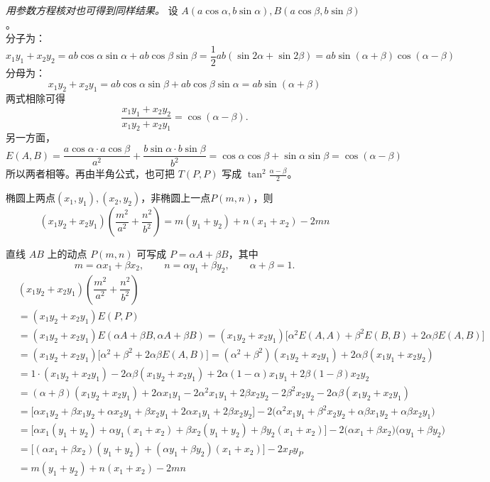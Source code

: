 \emph{用参数方程核对也可得到同样结果。} 设 $A(a\cos\alpha, b\sin\alpha), B(a\cos\beta, b\sin\beta)$。\\
分子为：
$$ x_1y_1 + x_2y_2 = ab\cos\alpha\sin\alpha + ab\cos\beta\sin\beta = \frac{1}{2}ab(\sin 2\alpha + \sin 2\beta) = ab\sin(\alpha+\beta)\cos(\alpha-\beta) $$
分母为：
$$ x_1y_2 + x_2y_1 = ab\cos\alpha\sin\beta + ab\cos\beta\sin\alpha = ab\sin(\alpha+\beta) $$
两式相除可得
\[
\frac{x_1y_1+x_2y_2}{x_1y_2+x_2y_1}=\cos(\alpha-\beta).
\]
另一方面，
$$ E(A,B) = \frac{a\cos\alpha \cdot a\cos\beta}{a^2} + \frac{b\sin\alpha \cdot b\sin\beta}{b^2} = \cos\alpha\cos\beta + \sin\alpha\sin\beta = \cos(\alpha-\beta) $$
所以两者相等。再由半角公式，也可把 $T(P,P)$ 写成 $\tan^2\frac{\alpha-\beta}{2}$。

\begin{conclusion}[一个化简公式]
椭圆上两点$(x_1,y_1),(x_2,y_2)$，非椭圆上一点$P(m,n)$，则
\[(x_1y_2+x_2y_1)\left(\dfrac{m^2}{a^2}+\dfrac{n^2}{b^2}\right)=m(y_1+y_2) + n(x_1+x_2) - 2mn \]
\end{conclusion}
直线 $AB$ 上的动点 $P(m,n)$ 可写成 $P = \alpha A + \beta B$，其中
\[
m = \alpha x_1 + \beta x_2,\qquad n = \alpha y_1 + \beta y_2,\qquad \alpha+\beta=1.
\]
\begin{align*}
&(x_1y_2+x_2y_1)\left(\dfrac{m^2}{a^2}+\dfrac{n^2}{b^2}\right) \\
&= (x_1y_2+x_2y_1) E(P, P) \\
&= (x_1y_2+x_2y_1) E(\alpha A + \beta B, \alpha A + \beta B)= (x_1y_2+x_2y_1) \big[ \alpha^2 E(A,A) + \beta^2 E(B,B) + 2\alpha\beta E(A,B) \big] \\
&= (x_1y_2+x_2y_1) \big[ \alpha^2 + \beta^2 + 2\alpha\beta E(A,B) \big] = (\alpha^2 + \beta^2)(x_1y_2+x_2y_1) + 2\alpha\beta (x_1y_1 + x_2y_2) \\
&= 1 \cdot (x_1y_2+x_2y_1) - 2\alpha\beta (x_1y_2+x_2y_1) + 2\alpha(1-\alpha) x_1y_1 + 2\beta(1-\beta) x_2y_2\\
&= (\alpha+\beta)(x_1y_2+x_2y_1) + 2\alpha x_1y_1 - 2\alpha^2 x_1y_1 + 2\beta x_2y_2 - 2\beta^2 x_2y_2 - 2\alpha\beta(x_1y_2+x_2y_1)  \\
&= \big[ \alpha x_1y_2 + \beta x_1y_2 + \alpha x_2y_1 + \beta x_2y_1 + 2\alpha x_1y_1 + 2\beta x_2y_2 \big] - 2 \big( \alpha^2 x_1y_1 + \beta^2 x_2y_2 + \alpha\beta x_1y_2 + \alpha\beta x_2y_1 \big)  \\
&= \big[ \alpha x_1(y_1+y_2) + \alpha y_1(x_1+x_2) + \beta x_2(y_1+y_2) + \beta y_2(x_1+x_2) \big] - 2 \big( \alpha x_1 + \beta x_2 \big)\big( \alpha y_1 + \beta y_2 \big) \\
&= \big[ (\alpha x_1 + \beta x_2)(y_1+y_2) + (\alpha y_1 + \beta y_2)(x_1+x_2) \big] - 2 x_P y_P  \\
&= m(y_1+y_2) + n(x_1+x_2) - 2mn
\end{align*}


